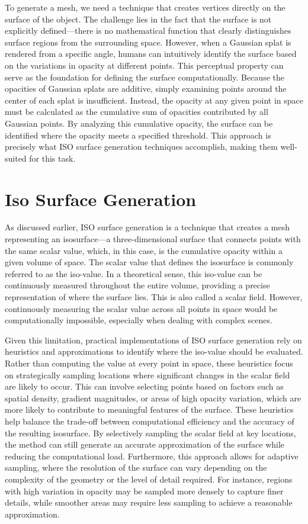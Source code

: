 To generate a mesh, we need a technique that creates vertices directly on the surface of the object. The challenge lies in the fact that the surface is not explicitly defined—there is no mathematical function that clearly distinguishes surface regions from the surrounding space. However, when a Gaussian splat is rendered from a specific angle, humans can intuitively identify the surface based on the variations in opacity at different points. This perceptual property can serve as the foundation for defining the surface computationally. Because the opacities of Gaussian splats are additive, simply examining points around the center of each splat is insufficient. Instead, the opacity at any given point in space must be calculated as the cumulative sum of opacities contributed by all Gaussian points. By analyzing this cumulative opacity, the surface can be identified where the opacity meets a specified threshold. This approach is precisely what ISO surface generation techniques accomplish, making them well-suited for this task.

\section{Iso Surface Generation}

As discussed earlier, ISO surface generation is a technique that creates a mesh representing an isosurface—a three-dimensional surface that connects points with the same scalar value, which, in this case, is the cumulative opacity within a given volume of space. The scalar value that defines the isosurface is commonly referred to as the iso-value. In a theoretical sense, this iso-value can be continuously measured throughout the entire volume, providing a precise representation of where the surface lies. This is also called a scalar field. However, continuously measuring the scalar value across all points in space would be computationally impossible, especially when dealing with complex scenes.

Given this limitation, practical implementations of ISO surface generation rely on heuristics and approximations to identify where the iso-value should be evaluated. Rather than computing the value at every point in space, these heuristics focus on strategically sampling locations where significant changes in the scalar field are likely to occur. This can involve selecting points based on factors such as spatial density, gradient magnitudes, or areas of high opacity variation, which are more likely to contribute to meaningful features of the surface. These heuristics help balance the trade-off between computational efficiency and the accuracy of the resulting isosurface. By selectively sampling the scalar field at key locations, the method can still generate an accurate approximation of the surface while reducing the computational load. Furthermore, this approach allows for adaptive sampling, where the resolution of the surface can vary depending on the complexity of the geometry or the level of detail required. For instance, regions with high variation in opacity may be sampled more densely to capture finer details, while smoother areas may require less sampling to achieve a reasonable approximation.

